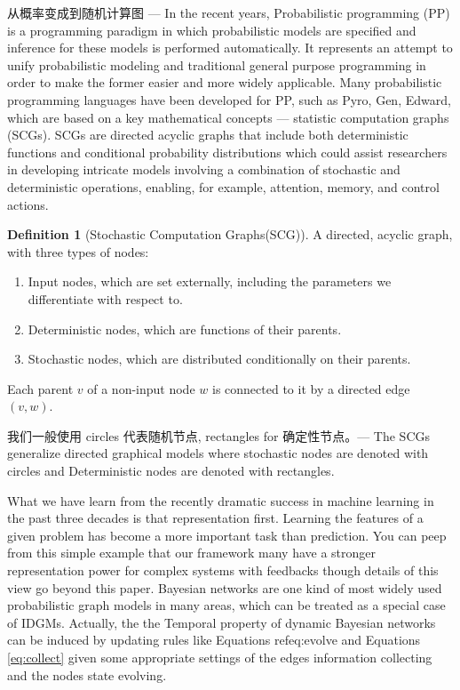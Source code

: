 \documentclass{article}
\theoremstyle{definition}
\newtheorem{definition}{Definition}[section]
\theoremstyle{remark}
\theoremstyle{definition}
\begin{document}
\begin{CJK*}{UTF8}{gbsn}
从概率变成到随机计算图 ---
In the recent years, Probabilistic programming (PP) is a programming paradigm in which probabilistic models are specified and inference for these models is performed automatically. It represents an attempt to unify probabilistic modeling and traditional general purpose programming in order to make the former easier and more widely applicable. Many probabilistic programming languages have been developed for PP, such as Pyro, Gen, Edward, which are based on a key mathematical concepts --- statistic computation graphs (SCGs). SCGs are directed acyclic graphs that include both deterministic functions and conditional probability distributions which could assist researchers in developing intricate models involving a combination of stochastic and deterministic operations, enabling, for example, attention, memory, and control actions.  

\begin{definition}[Stochastic Computation Graphs(SCG)]
A directed, acyclic graph, with three types of nodes:
\begin{enumerate}[(1)]
    \setlength\itemsep{-0.5em}
    \item Input nodes, which are set externally, including the parameters we differentiate with respect to.
    \item Deterministic nodes, which are functions of their parents.
    \item Stochastic nodes, which are distributed conditionally on their parents.
\end{enumerate}

Each parent $v$ of a non-input node $w$ is connected to it by a directed edge $(v, w)$.
\end{definition}

我们一般使用 circles 代表随机节点, rectangles for 确定性节点。---
The SCGs generalize directed graphical models where stochastic nodes are denoted with circles and Deterministic nodes are denoted with rectangles.





What we have learn from the recently dramatic success in machine learning in the past three decades is that representation first. Learning the features of a given problem has become a more important task than prediction. You can peep from this simple example that our framework many have a stronger representation power for complex systems with feedbacks though details of this view go beyond this paper. Bayesian networks are one kind of most widely used probabilistic graph models in many areas, which can be treated as a special case of IDGMs. Actually, the the Temporal property of dynamic Bayesian networks can be induced by updating rules like Equations ref{eq:evolve} and Equations \ref{eq:collect} given some appropriate settings of the edges information collecting and the nodes state evolving.


\end{CJK*}
\end{document}

